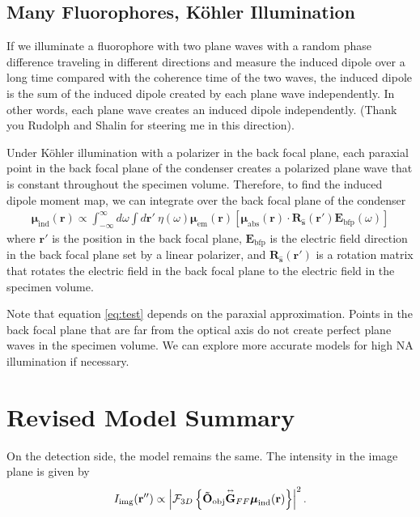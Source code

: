 \documentclass[11pt]{article}
\providecommand{\mb}[1]{\mathbf{#1}}
\providecommand{\bs}[1]{\boldsymbol{#1}}
\providecommand{\intinf}{\int_{-\infty}^{\infty}}
\newcommand{\tensor}[1]{\overset{\text{\tiny$\leftrightarrow$}}{\mb{#1}}}
\begin{document}
\subsection{Many Fluorophores, K\"{o}hler Illumination}
If we illuminate a fluorophore with two plane waves with a random phase
difference traveling in different directions and measure the induced dipole over
a long time compared with the coherence time of the two waves, the induced
dipole is the sum of the induced dipole created by each plane wave
independently. In other words, each plane wave creates an induced dipole
independently. (Thank you Rudolph and Shalin for steering me in this direction).

Under K\"{o}hler illumination with a polarizer in the back focal plane, each
paraxial point in the back focal plane of the condenser creates a polarized
plane wave that is constant throughout the specimen volume. Therefore, to find
the induced dipole moment map, we can integrate over the back focal plane of the condenser
\begin{align}
  \bs{\mu}_{\text{ind}}(\mb{r}) \propto
  \intinf d\omega
  \int d\mb{r'}\ \eta(\omega)\bs{\mu}_{\text{em}}(\mb{r})
  \left[\bs{\mu}_{\text{abs}}(\mb{r})\cdot \mb{R}_{\mb{\hat{s}}}(\mb{r'})\mb{E}_{\text{bfp}}(\omega)\right] \label{eq:test}
\end{align}
where $\mb{r'}$ is the position in the back focal plane, $\mb{E}_{\text{bfp}}$
is the electric field direction in the back focal plane set by a linear
polarizer, and $\mb{R}_{\mb{\hat{s}}}(\mb{r'})$ is a rotation matrix that rotates the electric field in the back focal plane to the electric field in the specimen volume. 

Note that equation \ref{eq:test} depends on the paraxial approximation. Points
in the back focal plane that are far from the optical axis do not create perfect
plane waves in the specimen volume. We can explore more accurate models for high
NA illumination if necessary.

\section{Revised Model Summary}
On the detection side, the model remains the same. The intensity in the image plane
is given by
\begin{align}
  I_{\text{img}}(\mb{r''}) \propto \left|\mathcal{F}_{3D}\left\{
  \mb{\tilde{O}}_{\text{obj}}\tensor{\mathbf{G}}_{FF}\bs{\mu}_{\text{ind}}(\mb{r})
  \right\}
  \right|^2.
\end{align}
\end{document}
